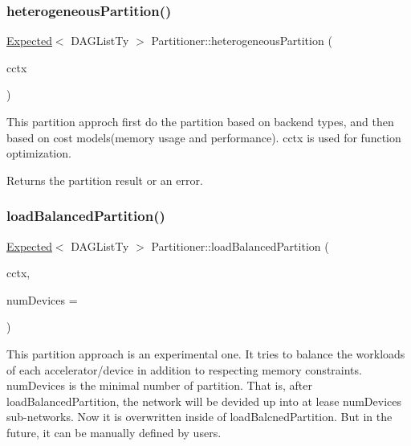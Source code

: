 \subsubsection{\texorpdfstring{heterogeneous\+Partition()}{heterogeneousPartition()}}
{\footnotesize\ttfamily \hyperlink{classglow_1_1detail_1_1_glow_expected}{Expected}$<$ D\+A\+G\+List\+Ty $>$ Partitioner\+::heterogeneous\+Partition (\begin{DoxyParamCaption}\item[{\hyperlink{structglow_1_1_compilation_context}{Compilation\+Context} \&}]{cctx }\end{DoxyParamCaption})}

This partition approch first do the partition based on backend types, and then based on cost models(memory usage and performance). {\ttfamily cctx} is used for function optimization. \begin{DoxyReturn}{Returns}
the partition result or an error. 
\end{DoxyReturn}
\mbox{\label{classglow_1_1_partitioner_aa1f821ee76481495e079c7fd9325b357}} 
\subsubsection{\texorpdfstring{load\+Balanced\+Partition()}{loadBalancedPartition()}}
{\footnotesize\ttfamily \hyperlink{classglow_1_1detail_1_1_glow_expected}{Expected}$<$ D\+A\+G\+List\+Ty $>$ Partitioner\+::load\+Balanced\+Partition (\begin{DoxyParamCaption}\item[{\hyperlink{structglow_1_1_compilation_context}{Compilation\+Context} \&}]{cctx,  }\item[{size\+\_\+t}]{num\+Devices = {} }\end{DoxyParamCaption})}

This partition approach is an experimental one. It tries to balance the workloads of each accelerator/device in addition to respecting memory constraints. {\ttfamily num\+Devices} is the minimal number of partition. That is, after load\+Balanced\+Partition, the network will be devided up into at lease {\ttfamily num\+Devices} sub-\/networks. Now it is overwritten inside of load\+Balcned\+Partition. But in the future, it can be manually defined by users. \mbox{\label{classglow_1_1_partitioner_a41d81aa72c7c6105def11a06097166fb}} 
